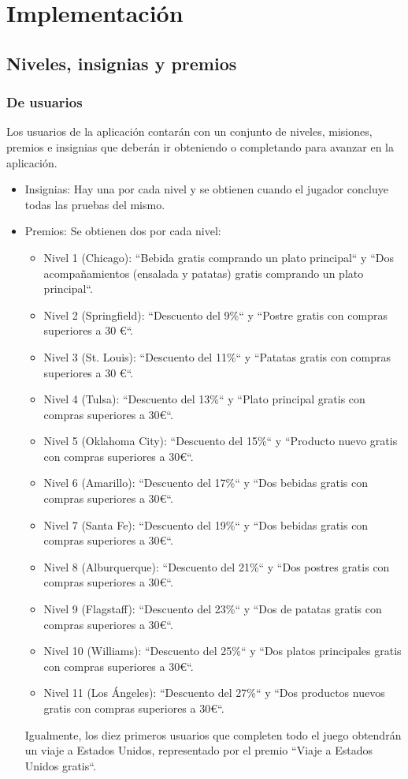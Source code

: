 \documentclass[twoside]{report}
\begin{document}
\section{Implementación}

\subsection{Niveles, insignias y premios}

\subsubsection{De usuarios}

Los usuarios de la aplicación contarán con un conjunto de niveles, misiones, premios e insignias que deberán ir obteniendo o completando para avanzar en la aplicación. 

\begin{itemize}
\item Insignias: Hay una por cada nivel y se obtienen cuando el jugador concluye todas las pruebas del mismo.
\item Premios: Se obtienen dos por cada nivel:
	\begin{itemize}
	\item Nivel 1 (Chicago): “Bebida gratis comprando un plato principal“ y “Dos acompañamientos (ensalada y patatas) gratis comprando un plato principal“.
	\item Nivel 2 (Springfield): “Descuento del 9\%“ y “Postre gratis con compras superiores a 30 \euro“.
	\item Nivel 3 (St. Louis): “Descuento del 11\%“ y “Patatas gratis con compras superiores a 30 \euro“.
	\item Nivel 4 (Tulsa): “Descuento del 13\%“ y “Plato principal gratis con compras superiores a 30\euro“.
	\item Nivel 5 (Oklahoma City): “Descuento del 15\%“ y “Producto nuevo gratis con compras superiores a 30\euro“.
	\item Nivel 6 (Amarillo): “Descuento del 17\%“ y “Dos bebidas gratis con compras superiores a 30\euro“.
	\item Nivel 7 (Santa Fe): “Descuento del 19\%“ y “Dos bebidas gratis con compras superiores a 30\euro“.
	\item Nivel 8 (Alburquerque): “Descuento del 21\%“ y “Dos postres gratis con compras superiores a 30\euro“.
	\item Nivel 9 (Flagstaff): “Descuento del 23\%“ y “Dos de patatas gratis con compras superiores a 30\euro“.
	\item Nivel 10 (Williams): “Descuento del 25\%“ y “Dos platos principales gratis con compras superiores a 30\euro“.
	\item Nivel 11 (Los Ángeles): “Descuento del 27\%“ y “Dos productos nuevos gratis con compras superiores a 30\euro“.
	\end{itemize}
	Igualmente, los diez primeros usuarios que completen todo el juego obtendrán un viaje a Estados Unidos, representado por el premio “Viaje a Estados Unidos gratis“.
\end{itemize}
\end{document}
